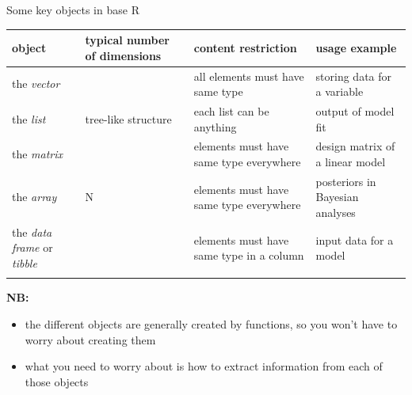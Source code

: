 \documentclass[
  ignorenonframetext,
  aspectratio=169,
]{beamer}
\newcounter{none} %
\providecommand{\tightlist}{%
  \setlength{\itemsep}{0pt}\setlength{\parskip}{0pt}}
\newcommand{\blueit}[1]{\textcolor{bluebeamer}{\emph{#1}}}
\begin{document}
\begin{frame}{Some key objects in base R}
\protect{}\label{some-key-objects-in-base-r}
\tiny

{\def\LTcaptype{none} %
\begin{longtable}[]{@{}
  >{\raggedright\arraybackslash}p{}
  >{\centering\arraybackslash}p{}
  >{\raggedright\arraybackslash}p{}
  >{\raggedright\arraybackslash}p{}@{}}
\toprule\noalign{}
\begin{minipage}[b]{\linewidth}\raggedright
object
\end{minipage} & \begin{minipage}[b]{\linewidth}\centering
typical number of dimensions
\end{minipage} & \begin{minipage}[b]{\linewidth}\raggedright
content restriction
\end{minipage} & \begin{minipage}[b]{\linewidth}\raggedright
usage example
\end{minipage} \\
\midrule\noalign{}
\endhead
the \blueit{vector} & 1 & all elements must have same type & storing
data for a variable \\
the \blueit{list} & tree-like structure & each list can be anything &
output of model fit \\
the \blueit{matrix} & 2 & elements must have same type everywhere &
design matrix of a linear model \\
the \blueit{array} & N & elements must have same type everywhere &
posteriors in Bayesian analyses \\
the \blueit{data frame} or \blueit{tibble} & 2 & elements must have same
type in a column & input data for a model \\
\bottomrule\noalign{}
\end{longtable}
}

\vspace{1em}

\pause

\small

\textbf{NB:}

\begin{itemize}
\tightlist
\item
  the different objects are generally created by functions, so you won't
  have to worry about creating them
\item
  what you need to worry about is how to extract information from each
  of those objects
\end{itemize}
\end{frame}
\end{document}
